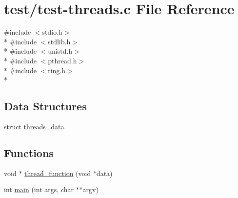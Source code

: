 \hypertarget{test-threads_8c}{\section{test/test-\/threads.c File Reference}
\label{test-threads_8c}
}
{\ttfamily \#include $<$stdio.\-h$>$}\\*
{\ttfamily \#include $<$stdlib.\-h$>$}\\*
{\ttfamily \#include $<$unistd.\-h$>$}\\*
{\ttfamily \#include $<$pthread.\-h$>$}\\*
{\ttfamily \#include $<$ring.\-h$>$}\\*
\subsection*{Data Structures}
\begin{DoxyCompactItemize}
\item 
struct \hyperlink{structthreads__data}{threads\-\_\-data}
\end{DoxyCompactItemize}
\subsection*{Functions}
\begin{DoxyCompactItemize}
\item 
void $\ast$ \hyperlink{test-threads_8c_ad15556d300d6d2b5fa79c8f6cbe465eb}{thread\-\_\-function} (void $\ast$data)
\item 
int \hyperlink{test-threads_8c_ab423fe86e32010f050d776f64231d2b1}{main} (int args, char $\ast$$\ast$argv)
\end{DoxyCompactItemize}


